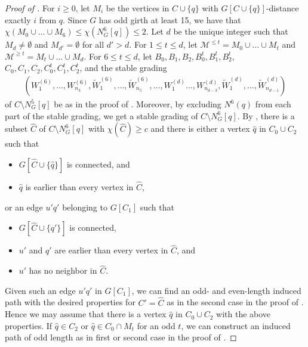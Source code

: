 \documentclass{article}
\begin{document}
\begin{proof}[Proof of ]
    For $i \geq 0$, let $M_i$ be the vertices in $C \cup \{q\}$ with $G\left[ C \cup \{q\}\right]$-distance exactly $i$ from $q$. Since $G$ has odd girth at least 15, we have that $\chi(M_0 \cup \dots \cup M_6) \leq \chi(N_G^6[q]) \leq 2$. Let $d$ be the unique integer such that $M_d \neq \emptyset$ and $M_{d'} = \emptyset$ for all $d' > d$.
    For $1 \leq t \leq d$, let $\mathcal{M}^{\leq t} = M_0 \cup \dots \cup M_t$ and $\mathcal{M}^{\geq t} = M_t \cup \dots \cup M_d$.
    For $6 \leq t \leq d$, let $B_0, B_1, B_2, B_0^t, B_1^t, B_2^t$, $C_0, C_1, C_2, C_0^t, C_1^t, C_2^t$, and the stable grading
    \begin{align}\label{eq:stable_grading1}
        \left(W^{(6)}_1, \dots, W_{n_{3}}^{(6)}, \widetilde{W}^{(6)}_1, \dots, \widetilde{W}^{(6)}_{n_5}, \dots,  W_1^{(d)}\dots, W_{n_{d - 3}}^{(d)}, \widetilde{W}_1^{(d)}, \dots, \widetilde{W}_{n_{d - 1}}^{(d)} \right)
    \end{align}
    of $C \setminus N^5_G[q]$ be as in the proof of .
    Moreover, by excluding $N^6(q)$ from each part of the stable grading, we get a stable grading of $C \setminus  N_G^6[q]$. By , there is a subset $\widehat{C}$ of $C \setminus N_G^6[q]$ with $\chi(\widehat{C}) \geq c$ and there is either a vertex $\hat{q}$ in $C_0 \cup C_2$ such that 
    \begin{itemize}
        \item $G[\widehat{C} \cup \{\hat{q}\}]$ is connected, and
        \item ${\hat{q}}$ is earlier than every vertex in $\widehat{C}$,
    \end{itemize}
    or an edge $u'q'$ belonging to $G[C_1]$ such that 
    \begin{itemize}
        \item $G[\widehat{C} \cup \{q'\}]$ is connected,
        \item $u'$ and $q'$ are earlier than every vertex in $\widehat{C}$, and 
        \item $u'$ has no neighbor in $\widehat{C}$.
    \end{itemize}
Given such an edge $u'q'$ in $G[C_1]$, we can find an odd- and even-length induced path with the desired properties for $C' = \widehat{C}$ as in the second case in the proof of .
Hence we may assume that there is a vertex $\hat{q}$ in $C_0 \cup C_2$ with the above properties. If $\hat{q} \in C_2$ or $\hat{q} \in C_0 \cap M_t$ for an odd $t$, we can construct an induced path of odd length as in first or second case in the proof of . 


\end{proof}
\end{document}
